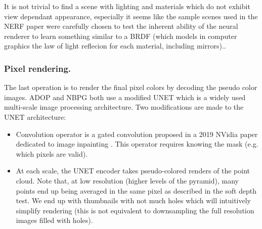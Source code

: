 It is not trivial to find a scene with lighting and materials which do not exhibit view dependant appearance, especially it seems like the sample scenes used in the NERF paper were carefully chosen to test the inherent ability of the neural renderer to learn something similar to a BRDF (which models in computer graphics the law of light reflecion for each material, including mirrors)..



\subsubsection{Pixel rendering.}
\label{sec:pixel rendering}
The last operation is to render the final pixel colors by decoding the pseudo color images.
ADOP \cite{Aruckert2022adop} and NBPG \cite{Aliev2020} both use a modified UNET \cite{ronneberger2015unet} which is a widely used multi-scale image processing architecture. Two modifications are made to the UNET architecture:
\begin{itemize}
    \item Convolution operator is a gated convolution proposed in a 2019 NVidia paper dedicated to image inpainting \cite{yu2019freeform}. This operator requires knowing the mask (e.g. which pixels are valid).
    \item At each scale, the UNET encoder takes pseudo-colored renders of the point cloud. Note that, at low resolution (higher levels of the pyramid), many points end up being averaged in the same pixel as described in the soft depth test. We end up with thumbnails with not much holes which will intuitively simplify rendering (this is not equivalent to downsampling the full resolution images filled with holes). 
\end{itemize}


